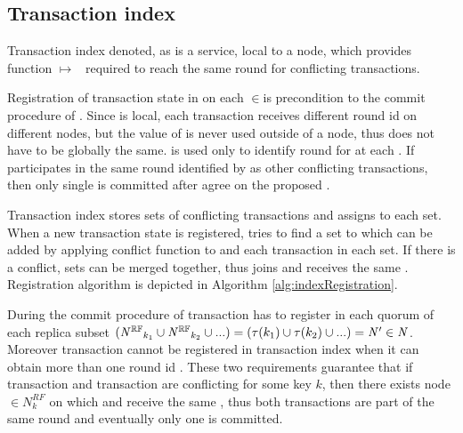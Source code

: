 
\subsection{Transaction index}
\label{sec:mpp:txIndex}
Transaction index denoted, as \txIndex is a service, local to a node, which provides function \mbox{\txState $\mapsto $ \paxosRoundId} required to reach the same \paxos round for conflicting transactions.

Registration of transaction state \txState in \txIndex on each  $\in$\nodesTx is precondition to the commit procedure of \mpt. 
Since \txIndex is local, each transaction \transaction receives different \paxos round id \paxosRoundId on different nodes, but the value of \paxosRoundId is never used outside of a node, thus \paxosRoundId does not have to be globally the same. \paxosRoundId is used only to identify \paxos round for \conflictingTxSet at each . If \transaction participates in the same \paxos round identified by \paxosRoundId as other conflicting transactions, then only single \transaction is committed after \nodesTx agree on the proposed \txState.



Transaction index stores sets of conflicting transactions \conflictingTxSet and assigns \paxosRoundId to each set. When a new transaction state \txStateM is registered, \txIndex tries to find a set \conflictingTxSet to which \txStateM can be added by applying conflict function \conflictFunction to \txStateM and each transaction \transaction in each set. If there is a conflict, sets can be merged together, thus \txStateM joins \conflictingTxSet and receives the same \paxosRoundId. Registration algorithm is depicted in Algorithm \ref{alg:indexRegistration}.

During the commit procedure of \mpt transaction \transactionFull has to register in each quorum of each replica subset
$(\mathit{N^{\mathbb{RF}}}_{k_1} \cup \mathit{N^{\mathbb{RF}}}_{k_2} \cup ... ) =
(\tau(k_1) \cup \tau(k_2) \cup ... ) = 
 \text{$\mathit{N'}$}\in\mathit{N}$.
Moreover transaction \transaction cannot be registered in transaction index \txIndex when it can obtain more than one \paxos round id \paxosRoundId. These two requirements guarantee that if transaction \txOne and transaction \txTwo are conflicting for some key $k$, then there exists node 
$\in N^{RF}_{k}$ on which \txOne and \txTwo receive the same \paxosRoundId, thus both transactions are part of the same \paxos round and eventually only one is committed.

